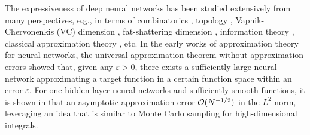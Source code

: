 \documentclass[nohyperref]{article}
\theoremstyle{plain}
\theoremstyle{definition}
\theoremstyle{remark}
\begin{document}
The expressiveness of deep neural networks has been studied extensively from many perspectives, e.g., in terms of combinatorics \cite{NIPS2014_5422}, topology \cite{ 6697897}, Vapnik-Chervonenkis (VC) dimension \cite{Bartlett98almostlinear,Sakurai,pmlr-v65-harvey17a}, fat-shattering dimension \cite{Kearns,Anthony:2009}, information theory \cite{PETERSEN2018296}, classical approximation theory \cite{Cybenko1989ApproximationBS,HORNIK1989359,barron1993,yarotsky18a,yarotsky2017,doi:10.1137/18M118709X,ZHOU2019,10.3389/fams.2018.00014,2019arXiv190501208G,2019arXiv190207896G,suzuki2018adaptivity,Ryumei,Wenjing,Bao2019ApproximationAO,2019arXiv191210382L,MO,shijun1,shijun2,shijun3,shijun:thesis}, etc. In the early works of approximation theory for neural networks, the universal approximation theorem  \cite{Cybenko1989ApproximationBS,HORNIK1991251,HORNIK1989359} without approximation errors showed that, given any $\varepsilon>0$, there exists a sufficiently large neural network approximating a target function in a certain function space within an error $\varepsilon$. For one-hidden-layer neural networks and sufficiently smooth functions, 
it is shown in \cite{barron1993,barron2018approximation} that an asymptotic approximation error ${\mathcal{O}}(N^{-1/2})$ in the $L^2$-norm, leveraging an idea that is similar to Monte Carlo sampling for high-dimensional integrals.  
\end{document}
